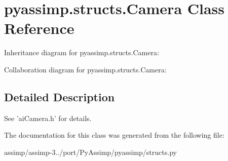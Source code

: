 \hypertarget{classpyassimp_1_1structs_1_1_camera}{\section{pyassimp.\+structs.\+Camera Class Reference}
\label{classpyassimp_1_1structs_1_1_camera}
}


Inheritance diagram for pyassimp.\+structs.\+Camera\+:


Collaboration diagram for pyassimp.\+structs.\+Camera\+:


\subsection{Detailed Description}
\begin{DoxyVerb}See 'aiCamera.h' for details.
\end{DoxyVerb}
 

The documentation for this class was generated from the following file\+:\begin{DoxyCompactItemize}
\item 
assimp/assimp-\/3../port/\+Py\+Assimp/pyassimp/structs.\+py\end{DoxyCompactItemize}
